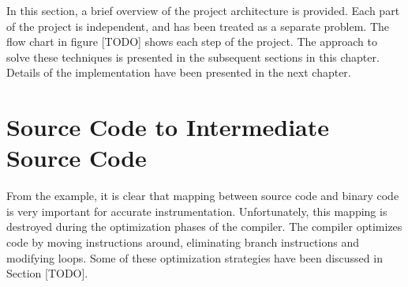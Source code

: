 In this section, a brief overview of the project architecture is provided. Each part of the project is independent, and has been treated as a separate problem. The flow chart in figure [TODO] shows each step of the project. The approach to solve these techniques is presented in the subsequent sections in this chapter. Details of the implementation have been presented in the next chapter.

%
%
%

\section{Source Code to Intermediate Source Code}
From the example, it is clear that mapping between source code and binary code is very important for accurate instrumentation. Unfortunately, this mapping is destroyed during the optimization phases of the compiler. The compiler optimizes code by moving instructions around, eliminating branch instructions and modifying loops. Some of these optimization strategies have been discussed in Section [TODO].

